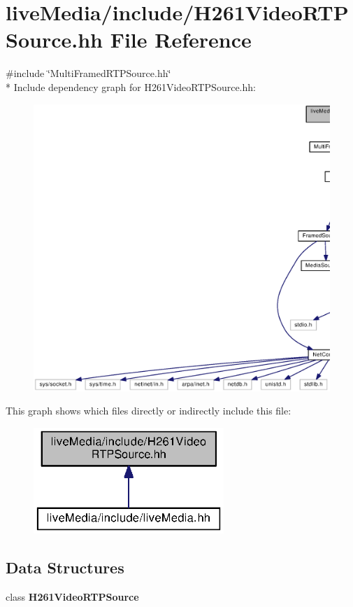 \section{live\+Media/include/\+H261\+Video\+R\+T\+P\+Source.hh File Reference}
\label{H261VideoRTPSource_8hh}
{\ttfamily \#include \char`\"{}Multi\+Framed\+R\+T\+P\+Source.\+hh\char`\"{}}\\*
Include dependency graph for H261\+Video\+R\+T\+P\+Source.\+hh\+:
\nopagebreak
\begin{figure}[H]
\begin{center}
\leavevmode
\includegraphics[width=350pt]{H261VideoRTPSource_8hh__incl}
\end{center}
\end{figure}
This graph shows which files directly or indirectly include this file\+:
\nopagebreak
\begin{figure}[H]
\begin{center}
\leavevmode
\includegraphics[width=204pt]{H261VideoRTPSource_8hh__dep__incl}
\end{center}
\end{figure}
\subsection*{Data Structures}
\begin{DoxyCompactItemize}
\item 
class {\bf H261\+Video\+R\+T\+P\+Source}
\end{DoxyCompactItemize}
